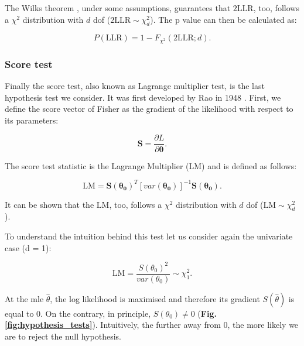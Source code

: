 The Wilks theorem \cite{wilks1938large}, under some assumptions, guarantees that $2\mathrm{LLR}$, too, follows a $\chi^2$ distribution with $d$ dof ($2\mathrm{LLR} \sim \chi^2_d$).
The p value can then be calculated as:

\begin{equation}\label{eq:lrt_p_value}
    P(\mathrm{LLR}) = 1-F_{\chi^2}(2\mathrm{LLR}; d).
\end{equation}

\subsubsection{Score test}

Finally the score test, also known as Lagrange multiplier test, is the last hypothesis test we consider. 
It was first developed by Rao in 1948 \cite{rao1948large}.
First, we define the score vector of Fisher as the gradient of the likelihood with respect to its parameters:

\begin{equation}\label{eq:score_vector}
    \mathbf{S} = \frac{\partial L}{\partial \boldsymbol{\theta}}.
\end{equation}

The score test statistic is the Lagrange Multiplier (LM) and is defined as follows:

\begin{equation}\label{eq:lagrange_multiplier}
    \mathrm{LM} = \mathbf{S}(\boldsymbol{\theta_0})^T [var(\boldsymbol{\theta_0})]^{-1}\mathbf{S}(\boldsymbol{\theta_0}). 
\end{equation}

It can be shown that the $\mathrm{LM}$, too, follows a $\chi^2$ distribution with $d$ dof ($\mathrm{LM} \sim \chi^2_d$).

To understand the intuition behind this test let us consider again the univariate case (d = 1):

\begin{equation}\label{eq:lagrange_multiplier_univariate}
    \mathrm{LM} = \frac{S(\theta_0)^2}{var(\theta_0)} \sim \chi^2_1.
\end{equation}

At the \gls{mle} $\hat{\theta}$, the log likelihood is maximised and therefore its gradient $S(\hat{\theta})$ is equal to $0$.
On the contrary, in principle, $ S(\theta_0) \neq 0 $ (\textbf{Fig. \ref{fig:hypothesis_tests}}). 
Intuitively, the further away from 0, the more likely we are to reject the null hypothesis.

